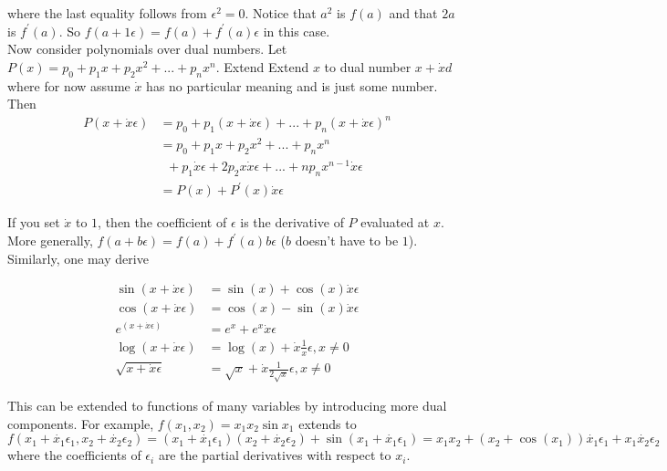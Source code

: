 \documentclass[11pt]{article}
\theoremstyle{definition}
\theoremstyle{plain}
\begin{document}
\noindent where the last equality follows from $\epsilon^2=0$. 
Notice that $a^2$ is $f(a)$ and that $2a$ is $f^\prime(a)$. So $f(a+1\epsilon) = f(a) + f^\prime(a)\epsilon$ in this case.\\

\noindent Now consider polynomials over dual numbers. Let $P(x)= p_0 + p_1x + p_2x^2 +
... + p_n x^n$. Extend Extend $x$ to dual number $x + \dot{x}d$ where for now
assume $\dot{x}$ has no particular meaning and is just some number. Then
\begin{align*}
    P(x + \dot{x} \epsilon) &= 
        p_0 + p_1(x + \dot{x}\epsilon) + ... + p_n(x + \dot{x}\epsilon)^n\\
    &=  p_0 + p_1x + p_2x^2 + ... + p_n x^n \\
    &\phantom{a} + p_1 \dot{x} \epsilon + 2 p_2 x \dot{x} \epsilon + ... +
        n p_n x^{n-1} \dot{x} \epsilon \\
    &= P(x) + P^\prime(x) \dot{x} \epsilon    
\end{align*}

\noindent If you set $\dot{x}$ to $1$, then the coefficient of $\epsilon$ is
the derivative of $P$ evaluated at $x$. More generally,
$f(a + b \epsilon) = f(a) + f^\prime(a) b \epsilon$ 
($b$ doesn't have to be $1$). Similarly, one may derive

\begin{align*}
    \sin(x + \dot{x} \epsilon) &= \sin(x) + \cos(x) \dot{x} \epsilon\\
    \cos(x + \dot{x} \epsilon) &= \cos(x) - \sin(x) \dot{x} \epsilon\\
    e^{(x + \dot{x} \epsilon)} &= e^x + e^x \dot{x} \epsilon\\
    \log(x + \dot{x} \epsilon) &= \log(x) + \dot{x}\frac{1}{x} \epsilon, x \neq 0 \\
    \sqrt{x + \dot{x} \epsilon} &= \sqrt{x} + \dot{x} \frac{1}{2\sqrt{x}} \epsilon, x \neq 0
\end{align*}


\noindent This can be extended to functions of many variables
by introducing more dual components. For example, $f(x_1,x_2) = x_1 x_2 \sin x_1$
extends to 
$$f(x_1 + \dot{x_1} \epsilon_1, x_2 + \dot{x_2} \epsilon_2) = 
(x_1 + \dot{x_1}\epsilon_1)(x_2 + \dot{x_2}\epsilon_2) + \sin(x_1 + \dot{x_1}\epsilon_1) =
x_1 x_2 + (x_2 + \cos(x_1))\dot{x_1}\epsilon_1 + x_1 \dot{x_2} \epsilon_2 $$
\noindent where the coefficients of $\epsilon_i$ are the partial derivatives with respect
to $x_i$.
\end{document}

